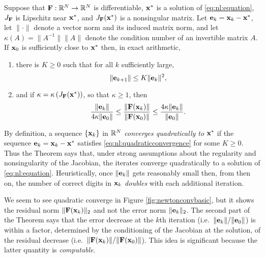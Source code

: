 \begin{theorem}
Suppose that $\mathbf{F}:\mathbb{R}^N\to\mathbb{R}^N$ is differentiable, $\mathbf{x}^*$ is a solution of \eqref{eq:nl:equation}, $J_{\mathbf{F}}$ is Lipschitz near $\mathbf{x}^*$, and $J_{\mathbf{F}}(\mathbf{x}^*)$ is a nonsingular matrix.  Let $\mathbf{e}_k=\mathbf{x}_k-\mathbf{x}^*$, let $\|\cdot\|$ denote a vector norm and its induced matrix norm, and let $\kappa(A)=\|A^{-1}\| \|A\|$ denote the condition number of an invertible matrix $A$.  If $\mathbf{x}_0$ is sufficiently close to $\mathbf{x}^*$ then, in exact arithmetic,
\renewcommand{\labelenumi}{(\roman{enumi})}
\begin{enumerate}
\item there is $K\ge 0$ such that for all $k$ sufficiently large,
\begin{equation}
	\|\mathbf{e}_{k+1}\| \le K \|\mathbf{e}_k\|^2, \label{eq:nl:quadraticconvergence}
\end{equation}
\item and if $\kappa = \kappa\left(J_{\mathbf{F}}(\mathbf{x}^*)\right)$, so that $\kappa\ge 1$, then
\begin{equation}
	\frac{\|\mathbf{e}_k\|}{4 \kappa \|\mathbf{e}_0\|} \le \frac{\|\mathbf{F}(\mathbf{x}_k)\|}{\|\mathbf{F}(\mathbf{x}_0)\|} \le \frac{4 \kappa \|\mathbf{e}_k\|}{\|\mathbf{e}_0\|}. \label{eq:nl:errorresidualnormequiv}
\end{equation}
\end{enumerate}
\end{theorem}

\medskip
By definition, a sequence $\{\mathbf{x}_k\}$ in $\mathbb{R}^N$ \emph{converges quadratically to} $\mathbf{x}^*$ if the sequence $\mathbf{e}_k=\mathbf{x}_k-\mathbf{x}^*$ satisfies \eqref{eq:nl:quadraticconvergence} for some $K\ge 0$.  Thus the Theorem says that, under strong assumptions about the regularity and nonsingularity of the Jacobian, the iterates converge quadratically to a solution of \eqref{eq:nl:equation}.  Heuristically, once $\|\mathbf{e}_k\|$ gets reasonably small then, from then on, the number of correct digits in $\mathbf{x}_k$ \emph{doubles} with each additional iteration.

We seem to see quadratic converge in Figure \ref{fig:newtonconvbasic}, but it shows the residual norm $\|\mathbf{F}(\mathbf{x}_k)\|_2$ and not the error norm $\|\mathbf{e}_k\|_2$.  The second part of the Theorem says that the error decrease at the $k$th iteration (i.e.~$\|\mathbf{e}_k\|/\|\mathbf{e}_0\|$) is within a factor, determined by the conditioning of the Jacobian at the solution, of the residual decrease (i.e.~$\|\mathbf{F}(\mathbf{x}_k)\|/\|\mathbf{F}(\mathbf{x}_0)\|$).  This idea is significant because the latter quantity is \emph{computable}.

